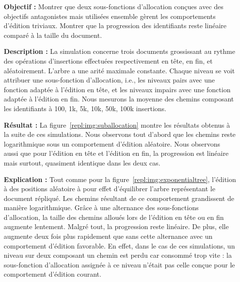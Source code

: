 \begin{itemize}
\item [\textbf{Objectif :}] Montrer que deux sous-fonctions d'allocation conçues
  avec des objectifs antagonistes mais utilisées ensemble gèrent les
  comportements d'édition triviaux. Montrer que la progression des identifiants
  reste linéaire comparé à la taille du document.
\item [\textbf{Description :}] La simulation concerne trois documents
  grossissant au rythme des opérations d'insertions effectuées respectivement en
  tête, en fin, et aléatoirement. L'arbre a une arité maximale constante. Chaque
  niveau se voit attribuer une sous-fonction d'allocation, i.e., les niveaux
  pairs avec une fonction adaptée à l'édition en tête, et les niveaux impairs
  avec une fonction adaptée à l'édition en fin. Nous mesurons la moyenne des
  chemins composant les identifiants à 100, 1k, 5k, 10k, 50k, 100k insertions.
\item [\textbf{Résultat :}] La figure~\ref{repl:img:suballocation} montre les
  résultats obtenus à la suite de ces simulations. Nous observons tout d'abord
  que les chemins reste logarithmique sous un comportement d'édition
  aléatoire. Nous observons aussi que pour l'édition en tête et l'édition en
  fin, la progression est linéaire mais surtout, quasiment identique dans les
  deux cas.
\item [\textbf{Explication :}] Tout comme pour la
  figure~\ref{repl:img:exponentialtree}, l'édition à des positions aléatoire à
  pour effet d'équilibrer l'arbre représentant le document répliqué. Les chemins
  résultant de ce comportement grandissent de manière logarithmique. Grâce à une
  alternance des sous-fonctions d'allocation, la taille des chemins alloués lors
  de l'édition en tête ou en fin augmente lentement. Malgré tout, la progression
  reste linéaire. De plus, elle augmente deux fois plus rapidement que sans
  cette alternance avec un comportement d'édition favorable. En effet, dans le
  cas de ces simulations, un niveau sur deux composant un chemin est perdu car
  consommé trop vite : la sous-fonction d'allocation assignée à ce niveau
  n'était pas celle conçue pour le comportement d'édition courant.
\end{itemize}

